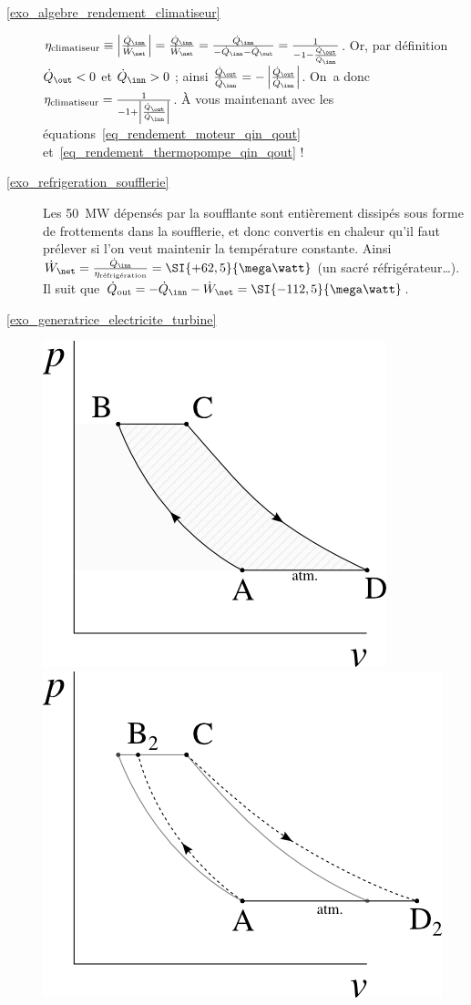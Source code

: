 \begin{description}
	\item [\ref{exo_algebre_rendement_climatiseur}]
			\tab $ \eta_\text{climatiseur} 
			\equiv \left|\frac{\dot Q_\inn}{\dot W_\net}\right| 
			= \frac{\dot Q_\inn}{\dot W_\net} 
			= \frac{\dot Q_\inn}{-\dot Q_\inn - \dot Q_\out} 
			= \frac{1}{-1 - \frac{\dot Q_\out}{\dot Q_\inn}}$.
			Or, par définition $\dot Q_\out < 0$ et $\dot Q_\inn > 0$ ; ainsi  $\frac{\dot Q_\out}{\dot Q_\inn} = -\left|\frac{\dot Q_\out}{\dot Q_\inn}\right|$.
			On~a donc $\eta_\text{climatiseur} = \frac{1}{-1 + \left|\frac{\dot Q_\out}{\dot Q_\inn}\right|}$. À vous maintenant avec les équations~\ref{eq_rendement_moteur_qin_qout} et~\ref{eq_rendement_thermopompe_qin_qout} !			
	\item [\ref{exo_refrigeration_soufflerie}] 
			\tab Les \SI{50}{\mega\watt} dépensés par la soufflante sont entièrement dissipés sous forme de frottements dans la soufflerie, et donc convertis en chaleur qu’il faut prélever si l’on veut maintenir la température constante. Ainsi $\dot W_\net = \frac{\dot Q_\inn}{\eta_\text{réfrigération}} = \SI{+62,5}{\mega\watt}$ (un sacré réfrigérateur…). Il suit que $\dot Q_\text{out} = -\dot Q_\inn - \dot W_\net = \SI{-112,5}{\mega\watt}$.
	\item [\ref{exo_generatrice_electricite_turbine}] 
			\includegraphics[height=\solutiondiagramwidth]{images/exo_sol_pv_turbomoteur_1.png}
			\includegraphics[height=\solutiondiagramwidth]{images/exo_sol_pv_turbomoteur_2.png}

\end{description}
